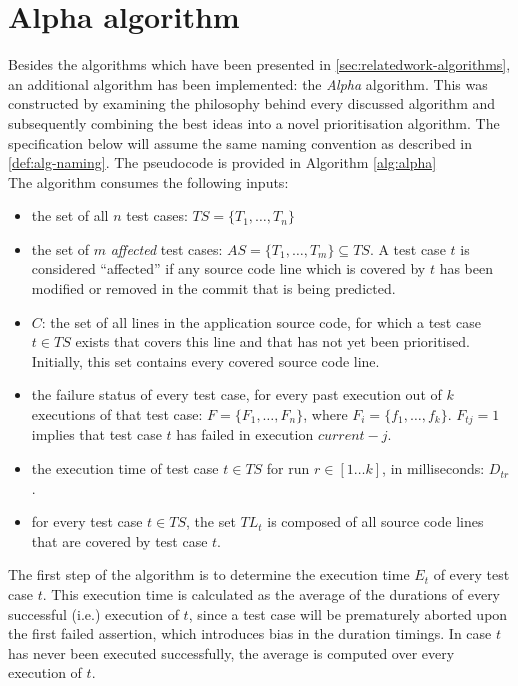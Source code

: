 
\section{Alpha algorithm}\label{sec:velocity-alpha}
Besides the algorithms which have been presented in \autoref{sec:relatedwork-algorithms}, an additional algorithm has been implemented: the \emph{Alpha} algorithm. This was constructed by examining the philosophy behind every discussed algorithm and subsequently combining the best ideas into a novel prioritisation algorithm. The specification below will assume the same naming convention as described in \autoref{def:alg-naming}. The pseudocode is provided in Algorithm \ref{alg:alpha}\\

\noindent The algorithm consumes the following inputs:
\begin{itemize}
	\item the set of all $n$ test cases: $TS = \{T_1, \dots, T_n\}$
	
	\item the set of $m$ \emph{affected} test cases: $AS = \{T_1, \dots, T_m\} \subseteq TS$. A test case $t$ is considered ``affected'' if any source code line which is covered by $t$ has been modified or removed in the commit that is being predicted.
	
	\item $C$: the set of all lines in the application source code, for which a test case $t \in TS$ exists that covers this line and that has not yet been prioritised. Initially, this set contains every covered source code line.
	
	\item the failure status of every test case, for every past execution out of $k$ executions of that test case: $F = \{F_1, \dots, F_n\}$, where $F_i = \{f_1, \dots, f_k\}$. $F_{tj} = 1$ implies that test case $t$ has failed in execution $current - j$.
	
	\item the execution time of test case $t \in TS$ for run $r \in [1 \dots k]$, in milliseconds: $D_{tr}$.
	
	\item for every test case $t \in TS$, the set $TL_t$ is composed of all source code lines that are covered by test case $t$.
\end{itemize}

\noindent The first step of the algorithm is to determine the execution time $E_t$ of every test case $t$. This execution time is calculated as the average of the durations of every successful (i.e.) execution of $t$, since a test case will be prematurely aborted upon the first failed assertion, which introduces bias in the duration timings. In case $t$ has never been executed successfully, the average is computed over every execution of $t$.

